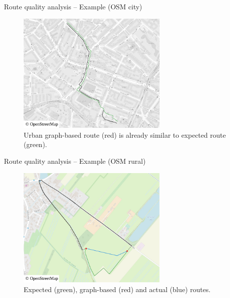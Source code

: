 \documentclass[xcolor={x11names}]{beamer}
\newenvironment{figcenter}
{%
	\parskip=0pt%
	\par%
	\nopagebreak%
	\centering%
}%
{%
	\par%
	\noindent%
	\ignorespacesafterend%
}
\begin{document}
		\begin{frame}{Route quality analysis -- Example (OSM city)}
		\begin{figure}
			\begin{figcenter}
				\includegraphics[width=0.65\textwidth]{images/qgis-routing-similar.pdf}
			\end{figcenter}
			\caption{Urban graph-based route (red) is already similar to expected route (green).}
		\end{figure}
		\end{frame}
		
		\begin{frame}{Route quality analysis -- Example (OSM rural)}
			\begin{figure}
				\begin{figcenter}
					\includegraphics[width=0.65\textwidth]{images/qgis-routing-rural-routing-6-graph-based.pdf}
				\end{figcenter}
				\caption{Expected (green), graph-based (red) and actual (blue) routes.\newline\ }
			\end{figure}
		\end{frame}
		
\end{document}
